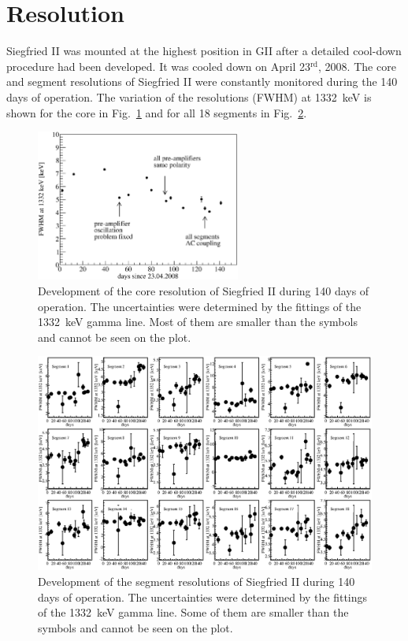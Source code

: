 \section{Resolution}
\label{sec:ii:sigma}
Siegfried II was mounted at the highest position in GII after a detailed cool-down procedure had been developed. It was cooled down on April 23$^{\text{rd}}$, 2008. The core and segment resolutions of Siegfried II were constantly monitored during the 140 days of operation. The variation of the resolutions (FWHM) at 1332~keV is shown for the core in Fig.~\ref{fig:ii:fwhm_core} and for all 18 segments in Fig.~\ref{fig:ii:fwhm_segs}.
\begin{figure}[hbtp]
\centering
\includegraphics[width=0.6\textwidth]{fwhm_versus_time_core}
\caption{Development of the core resolution of Siegfried II during 140 days of operation. The uncertainties were determined by the fittings of the 1332~keV gamma line. Most of them are smaller than the symbols and cannot be seen on the plot.}
\label{fig:ii:fwhm_core}
\end{figure}

\begin{figure}
\centering
\includegraphics{fwhm_versus_time_segments}
\caption{Development of the segment resolutions of Siegfried II during 140 days of operation. The uncertainties were determined by the fittings of the 1332~keV gamma line. Some of them are smaller than the symbols and cannot be seen on the plot.}
\label{fig:ii:fwhm_segs}
\end{figure}

